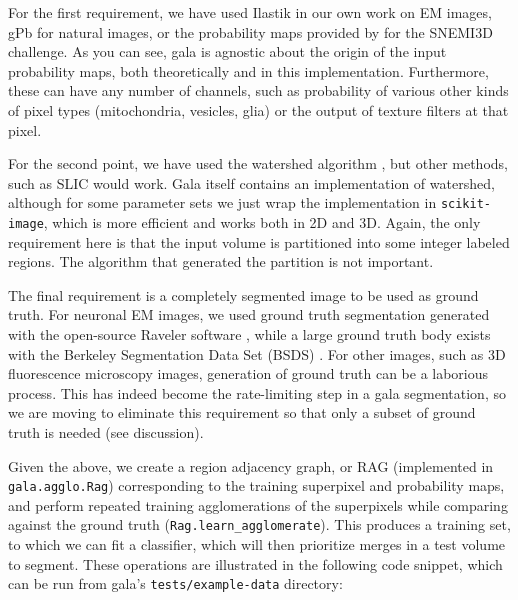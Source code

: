 \documentclass{frontiersSCNS} %
\begin{document}
For the first requirement, we have used Ilastik \citep{ilastik} in our own work on EM images, gPb \citep{globalpb} for natural images, or the probability maps provided by \cite{Ciresan:2012vi} for the SNEMI3D challenge.
As you can see, gala is agnostic about the origin of the input probability maps, both theoretically and in this implementation.
Furthermore, these can have any number of channels, such as probability of various other kinds of pixel types (mitochondria, vesicles, glia) or the output of texture filters at that pixel.

For the second point, we have used the watershed algorithm \citep{Vincent:1991}, but other methods, such as SLIC \citep{Achanta:2012wc} would work.
Gala itself contains an implementation of watershed, although for some parameter sets we just wrap the implementation in \texttt{\small scikit-image}, which is more efficient and works both in 2D and 3D.
Again, the only requirement here is that the input volume is partitioned into some integer labeled regions.
The algorithm that generated the partition is not important.

The final requirement is a completely segmented image to be used as ground truth.
For neuronal EM images, we used ground truth segmentation generated with the open-source Raveler software \citep{raveler}, while a large ground truth body exists with the Berkeley Segmentation Data Set (BSDS) \citep{MartinFTM01}.
For other images, such as 3D fluorescence microscopy images, generation of ground truth can be a laborious process.
This has indeed become the rate-limiting step in a gala segmentation, so we are moving to eliminate this requirement so that only a subset of ground truth is needed (see discussion).

Given the above, we create a region adjacency graph, or RAG (implemented in \texttt{\small gala.agglo.Rag}) corresponding to the training superpixel and probability maps, and perform repeated training agglomerations of the superpixels while comparing against the ground truth (\texttt{\small Rag.learn\_agglomerate}).
This produces a training set, to which we can fit a classifier, which will then prioritize merges in a test volume to segment.
These operations are illustrated in the following code snippet, which can be run from gala's \texttt{\small tests/example-data} directory:
\end{document}
